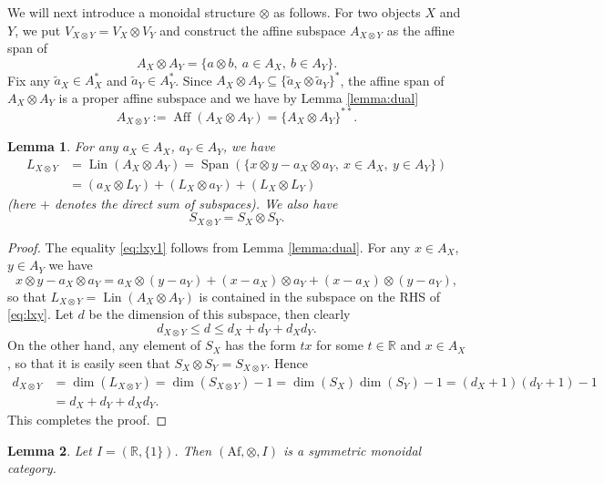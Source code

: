 \documentclass[12pt]{article}
\newtheorem{lemma}{Lemma}
\theoremstyle{definition}
\theoremstyle{remark}
\def\aff{\operatorname{Aff}}
\def\lin{\operatorname{Lin}}
\def\Span{\operatorname{Span}}
\def \Af{\mathrm{Af}}
\begin{document}
We will next introduce a monoidal structure $\otimes$ as follows. For two objects $X$ and
$Y$, we put  $V_{X\otimes Y}=V_X\otimes V_Y$ and construct the affine subspace
$A_{X\otimes Y}$ as the affine span of 
\[
A_X\otimes A_Y=\{a\otimes b,\ a\in A_X,\ b\in A_Y\}.
\]
Fix any $\tilde a_X\in A^*_X$ and $\tilde a_Y\in A^*_Y$. 
Since $A_X\otimes A_Y\subseteq \{\tilde a_X\otimes \tilde a_Y\}^*$, the affine span of
$A_X\otimes A_Y$ is a proper affine subspace and we have by Lemma \ref{lemma:dual}
\[
A_{X\otimes Y}:=\aff(A_X\otimes A_Y)=\{A_X\otimes A_Y\}^{**}.
\]
\begin{lemma}\label{lemma:tensor_spaces}
For any $a_X\in A_X$, $a_Y\in A_Y$, we  have
\begin{align}
L_{X\otimes Y}&=\lin(A_X\otimes A_Y)=\Span(\{x\otimes y-a_X\otimes a_Y,\ x\in A_X,\ y\in
A_Y\})\label{eq:lxy1}\\
&= (a_X\otimes L_Y)+ (L_X\otimes a_Y)+ (L_X\otimes L_Y)\label{eq:lxy}
\end{align}
(here $+$ denotes the direct sum of subspaces). We also have
\[
S_{X\otimes Y}=S_X\otimes S_Y.
\]
\end{lemma}

\begin{proof} The equality \eqref{eq:lxy1} follows from Lemma \ref{lemma:dual}. For any $x\in A_X$, $y\in A_Y$
 we have
\[
x\otimes y-a_X\otimes a_Y=a_X\otimes (y-a_Y)+(x-a_X)\otimes a_Y+(x-a_X)\otimes (y-a_Y),
\]
so that $L_{X\otimes Y}=\lin(A_X\otimes A_Y)$ is contained in the subspace on the RHS of \eqref{eq:lxy}.
Let $d$ be the dimension of this subspace, then clearly
\[
d_{X\otimes Y}\le d\le d_X+d_Y+d_Xd_Y.
\]
On the other hand, any element of $S_X$ has the form $tx$ for some $t\in \mathbb R$ and
$x\in A_X$, so that it is easily seen that $S_X\otimes S_Y=S_{X\otimes Y}$. 
Hence 
\begin{align*}
d_{X\otimes Y}&=\dim(L_{X\otimes Y})=\dim(S_{X\otimes
Y})-1=\dim(S_X)\dim(S_Y)-1=(d_X+1)(d_Y+1)-1\\
&=d_X+d_Y+d_Xd_Y.
\end{align*}
This completes the proof.

\end{proof}




\begin{lemma}\label{lemma:monoidal} Let $I=(\mathbb R,\{1\})$. Then 
$(\Af,\otimes, I)$ is a symmetric monoidal category.
\end{lemma}
\end{document}
